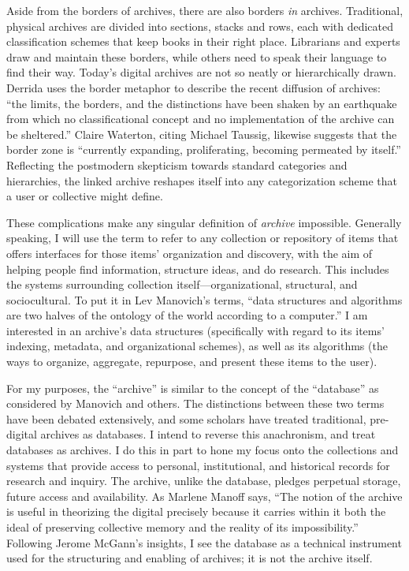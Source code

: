Aside from the borders of archives, there are also borders \emph{in} archives. Traditional, physical archives are divided into sections, stacks and rows, each with dedicated classification schemes that keep books in their right place. Librarians and experts draw and maintain these borders, while others need to speak their language to find their way. Today's digital archives are not so neatly or hierarchically drawn. Derrida uses the border metaphor to describe the recent diffusion of archives: ``the limits, the borders, and the distinctions have been shaken by an earthquake from which no classificational concept and no implementation of the archive can be sheltered.''\autocite[11]{derrida_archive_1995} Claire Waterton, citing Michael Taussig, likewise suggests that the border zone is ``currently expanding, proliferating, becoming permeated by itself.''\autocite[649]{waterton_experimenting_2010} Reflecting the postmodern skepticism towards standard categories and hierarchies, the linked archive reshapes itself into any categorization scheme that a user or collective might define.

These complications make any singular definition of \emph{archive} impossible. Generally speaking, I will use the term to refer to any collection or repository of items that offers interfaces for those items' organization and discovery, with the aim of helping people find information, structure ideas, and do research. This includes the systems surrounding collection itself---organizational, structural, and sociocultural. To put it in Lev Manovich's terms, ``data structures and algorithms are two halves of the ontology of the world according to a computer.''\autocite[84]{manovich_database_1999} I am interested in an archive's data structures (specifically with regard to its items' indexing, metadata, and organizational schemes), as well as its algorithms (the ways to organize, aggregate, repurpose, and present these items to the user).

For my purposes, the ``archive'' is similar to the concept of the ``database'' as considered by Manovich and others. The distinctions between these two terms have been debated extensively, and some scholars have treated traditional, pre-digital archives as databases.\autocite[See, e.g.,][]{manoff_archive_2010,freedman_responses_2007,barnet_pack-rat_2001} I intend to reverse this anachronism, and treat databases as archives. I do this in part to hone my focus onto the collections and systems that provide access to personal, institutional, and historical records for research and inquiry. The archive, unlike the database, pledges perpetual storage, future access and availability. As Marlene Manoff says, ``The notion of the archive is useful in theorizing the digital precisely because it carries within it both the ideal of preserving collective memory and the reality of its impossibility.''\autocite[396]{manoff_archive_2010} Following Jerome McGann's insights, I see the database as a technical instrument used for the structuring and enabling of archives; it is not the archive itself.\autocite[1588]{freedman_responses_2007}

